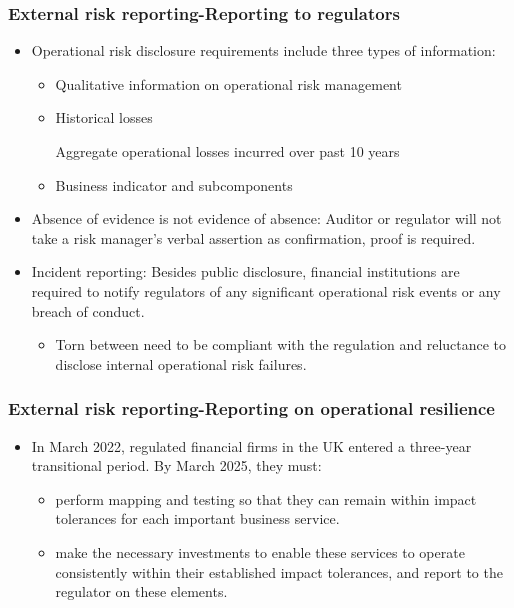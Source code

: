 \subsubsection{External risk reporting-Reporting to regulators}
\begin{itemize}
\item Operational risk disclosure requirements include three types of information:
    \begin{itemize}
    \item Qualitative information on operational risk management
    \item Historical losses
    
    Aggregate operational losses incurred over past 10 years
    \item Business indicator and subcomponents
    \end{itemize}
\item Absence of evidence is not evidence of absence: Auditor or regulator will not take a risk manager's verbal assertion as confirmation, proof is required.
\item Incident reporting: Besides public disclosure, financial institutions are required to notify regulators of any significant operational risk events or any breach of conduct.
    \begin{itemize}
    \item Torn between need to be compliant with the regulation and reluctance to disclose internal operational risk failures.
    \end{itemize}
    
\end{itemize}


\subsubsection{External risk reporting-Reporting on operational resilience}
\begin{itemize}
\item In March 2022, regulated financial firms in the UK entered a three-year transitional period. By March 2025, they must:
    \begin{itemize}
    \item perform mapping and testing so that they can remain within impact tolerances for each important business service.
    \item make the necessary investments to enable these services to operate consistently within their established impact tolerances, and report to the regulator on these elements.
    \end{itemize}
\end{itemize}



